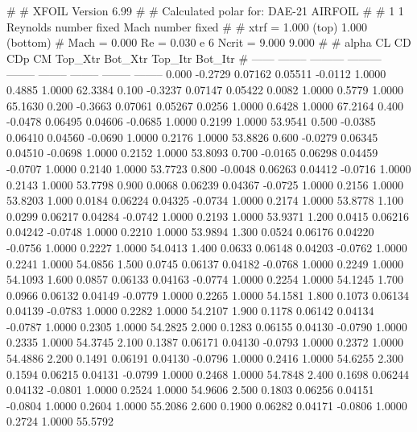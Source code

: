 #  
#       XFOIL         Version 6.99
#  
# Calculated polar for: DAE-21 AIRFOIL                                  
#  
# 1 1 Reynolds number fixed          Mach number fixed         
#  
# xtrf =   1.000 (top)        1.000 (bottom)  
# Mach =   0.000     Re =     0.030 e 6     Ncrit =   9.000  9.000
#  
#   alpha    CL        CD       CDp       CM     Top_Xtr  Bot_Xtr  Top_Itr  Bot_Itr
#  ------ -------- --------- --------- -------- -------- -------- -------- --------
   0.000  -0.2729   0.07162   0.05511  -0.0112   1.0000   0.4885   1.0000  62.3384
   0.100  -0.3237   0.07147   0.05422   0.0082   1.0000   0.5779   1.0000  65.1630
   0.200  -0.3663   0.07061   0.05267   0.0256   1.0000   0.6428   1.0000  67.2164
   0.400  -0.0478   0.06495   0.04606  -0.0685   1.0000   0.2199   1.0000  53.9541
   0.500  -0.0385   0.06410   0.04560  -0.0690   1.0000   0.2176   1.0000  53.8826
   0.600  -0.0279   0.06345   0.04510  -0.0698   1.0000   0.2152   1.0000  53.8093
   0.700  -0.0165   0.06298   0.04459  -0.0707   1.0000   0.2140   1.0000  53.7723
   0.800  -0.0048   0.06263   0.04412  -0.0716   1.0000   0.2143   1.0000  53.7798
   0.900   0.0068   0.06239   0.04367  -0.0725   1.0000   0.2156   1.0000  53.8203
   1.000   0.0184   0.06224   0.04325  -0.0734   1.0000   0.2174   1.0000  53.8778
   1.100   0.0299   0.06217   0.04284  -0.0742   1.0000   0.2193   1.0000  53.9371
   1.200   0.0415   0.06216   0.04242  -0.0748   1.0000   0.2210   1.0000  53.9894
   1.300   0.0524   0.06176   0.04220  -0.0756   1.0000   0.2227   1.0000  54.0413
   1.400   0.0633   0.06148   0.04203  -0.0762   1.0000   0.2241   1.0000  54.0856
   1.500   0.0745   0.06137   0.04182  -0.0768   1.0000   0.2249   1.0000  54.1093
   1.600   0.0857   0.06133   0.04163  -0.0774   1.0000   0.2254   1.0000  54.1245
   1.700   0.0966   0.06132   0.04149  -0.0779   1.0000   0.2265   1.0000  54.1581
   1.800   0.1073   0.06134   0.04139  -0.0783   1.0000   0.2282   1.0000  54.2107
   1.900   0.1178   0.06142   0.04134  -0.0787   1.0000   0.2305   1.0000  54.2825
   2.000   0.1283   0.06155   0.04130  -0.0790   1.0000   0.2335   1.0000  54.3745
   2.100   0.1387   0.06171   0.04130  -0.0793   1.0000   0.2372   1.0000  54.4886
   2.200   0.1491   0.06191   0.04130  -0.0796   1.0000   0.2416   1.0000  54.6255
   2.300   0.1594   0.06215   0.04131  -0.0799   1.0000   0.2468   1.0000  54.7848
   2.400   0.1698   0.06244   0.04132  -0.0801   1.0000   0.2524   1.0000  54.9606
   2.500   0.1803   0.06256   0.04151  -0.0804   1.0000   0.2604   1.0000  55.2086
   2.600   0.1900   0.06282   0.04171  -0.0806   1.0000   0.2724   1.0000  55.5792
